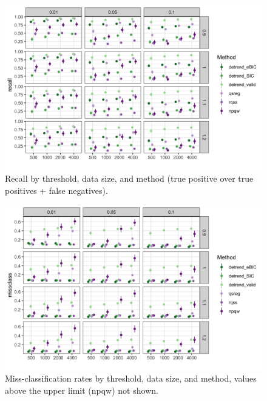 \documentclass[12pt]{article}
\begin{document}
	\begin{figure}[h!]
		\caption{Recall by threshold, data size, and method (true positive over true positives + false negatives).}
		\includegraphics[width = \linewidth]{Figures/peaks_recall.png}
	\end{figure}
	
	\begin{figure}[h!]
		\caption{Miss-classification rates by threshold, data size, and method, values above the upper limit (npqw) not shown.}
		\includegraphics[width = \linewidth]{Figures/peaks_missclass.png}
	\end{figure}
\end{document}
